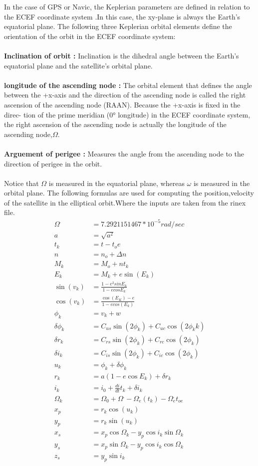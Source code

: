 \documentclass[10pt]{book}
\begin{document}
 In the case of GPS or Navic, the Keplerian
parameters are defined in relation to the ECEF coordinate system .In this case, the xy-plane is always the Earth's equatorial plane.
The following three Keplerian orbital elements define the orientation of the orbit in the
ECEF coordinate system:\\
\\
\textbf{Inclination of orbit :} Inclination is the dihedral angle between the Earth’s equatorial plane and the
satellite’s orbital plane.\\
\\
\textbf{longitude of the ascending node :} The orbital element that defines the
angle between the +x-axis and the direction of the ascending node is called the right
ascension of the ascending node (RAAN). Because the +x-axis is fixed in the direc-
tion of the prime meridian (0° longitude) in the ECEF coordinate system, the right
ascension of the ascending node is actually the longitude of the ascending node,$\Omega$.\\
\\
\textbf{Arguement of perigee :} Measures the angle
from the ascending node to the direction of perigee in the orbit. \\
\\
Notice that $\Omega$ is measured in the equatorial plane, whereas $\omega$ is measured in the orbital plane.
The following formulas are used for computing the position,velocity of the satellite in the elliptical orbit.Where the inputs are taken from the rinex file.
\begin{align}
  \Omega^. &= 7.2921151467*10^{-5} rad/sec \\
  a&=\sqrt{a^2} \\
  t_k&=t-t_oe \\
  n&=n_o+\Delta n \\
  M_k&=M_o+nt_k \\
  E_k&=M_k+e\sin(E_k) \\
  \sin(v_k) &=\frac{1 - e^2sin E_k}{1 - ecos E_k}\\
\cos(v_k)&=\frac{\cos(E_K)-e}{1-ecos(E_k)} \\
\phi_k&=v_k+w \\
\delta \phi_k &= C_{us}\sin(2 \phi_k ) + C_{uc}\cos(2 \phi_kk ) \\
\delta r_k &= C_{rs}\sin(2 \phi_k ) + C_{rc}\cos(2 \phi_k ) \\
\delta i_k &= C_{is}\sin(2 \phi_k ) + C_{ic}\cos(2 \phi_k ) \\
u_k&= \phi_k + \delta \phi_k \\
r_k &= a(1 - e\cos E_k ) + \delta r_k \\
i_k &= i_0 + \frac{di}{dt}t_k + \delta i_k \\
\Omega_k &= \Omega_0 + \Omega^. - \Omega_e^. (t_k ) - \Omega_e^. t_{oe} \\
x_p &= r_k \cos(u_k) \\
y_p &= r_k \sin(u_k) \\
x_s &= x_p \cos \Omega_k - y_p \cos i_k \sin \Omega_k \\
y_s &= x_p \sin \Omega_k - y_p \cos i_k \cos \Omega_k \\
z_s &= y_p \sin i_k
\end{align}
\end{document}

